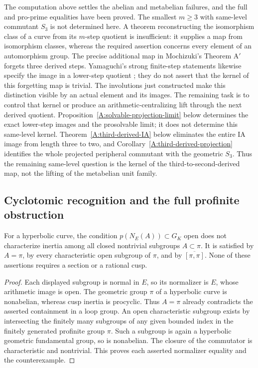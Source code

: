 \begin{remark}
\label{A:solvable-open}
The computation above settles the abelian and metabelian failures,
and the full and pro-prime equalities have been proved.  The
smallest $m\geq3$ with same-level commutant $S_3$ is not determined
here.  A theorem reconstructing the isomorphism class of a curve
from its $m$-step quotient is insufficient: it supplies a map
from isomorphism classes, whereas the required assertion concerns
every element of an automorphism group.  The precise additional
map in Mochizuki's Theorem A$'$ forgets three derived steps.
Yamaguchi's strong finite-step statements likewise specify the
image in a lower-step quotient \cite{A_Yamaguchi2024}; they do
not assert that the kernel of this forgetting map is trivial.
The involutions just constructed make this distinction visible by
an actual element and its images.  The remaining task is to
control that kernel or produce an arithmetic-centralizing lift
through the next derived quotient. Proposition~\ref{A:solvable-projection-limit}
below determines the exact lower-step images and the
prosolvable limit; it does not determine this same-level kernel.
Theorem~\ref{A:third-derived-IA} below eliminates the entire
IA image from length three to two, and
Corollary~\ref{A:third-derived-projection} identifies the
whole projected peripheral commutant with the geometric
$S_3$. Thus the remaining same-level question is the
kernel of the third-to-second-derived map, not the
lifting of the metabelian unit family.
\end{remark}

\subsection{Cyclotomic recognition and the full profinite obstruction}

\begin{proposition}
\label{A:literal-normalizer}
For a hyperbolic curve, the condition
$p(N_E(A))\subset G_K$ open does not characterize inertia among
all closed nontrivial subgroups $A\subset\pi$.  It is satisfied
by $A=\pi$, by every characteristic open subgroup of $\pi$, and
by $\overline{[\pi,\pi]}$.  None of these assertions requires
a section or a rational cusp.
\end{proposition}
\begin{proof}
Each displayed subgroup is normal in $E$, so its normalizer is
$E$, whose arithmetic image is open.  The geometric group $\pi$
of a hyperbolic curve is nonabelian, whereas cusp inertia is
procyclic.  Thus $A=\pi$ already contradicts the asserted
containment in a loop group.  An open characteristic subgroup
exists by intersecting the finitely many subgroups of any given
bounded index in the finitely generated profinite group $\pi$.
Such a subgroup is again a hyperbolic geometric fundamental
group, so is nonabelian.  The closure of the commutator is
characteristic and nontrivial.  This proves each asserted
normalizer equality and the counterexample.
\end{proof}

